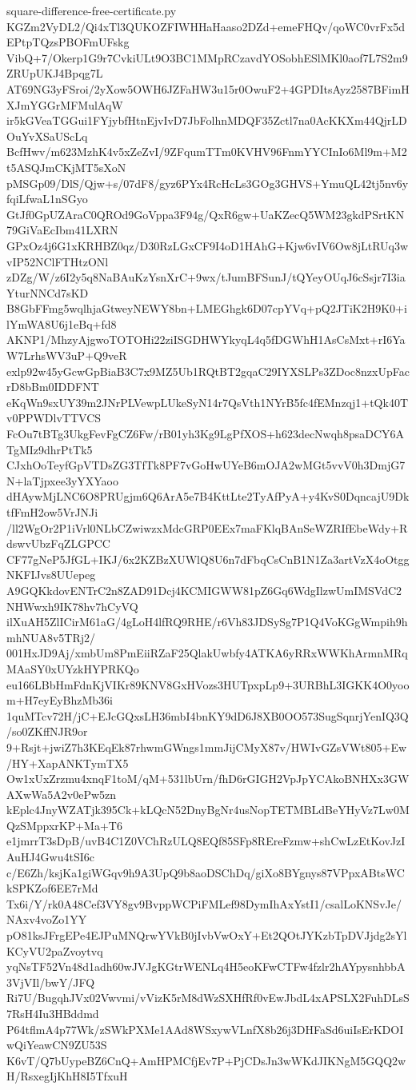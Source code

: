 \documentclass[11pt]{article}
\theoremstyle{definition}
\theoremstyle{remark}
\begin{document}
\begin{filecontents*}[overwrite]{square-difference-free-certificate.py}
KGZm2VyDL2/Qi4xTl3QUKOZFIWHHaHaaso2DZd+emeFHQv/qoWC0vrFx5dEPtpTQzsPBOFmUFskg
VibQ+7/Okerp1G9r7CvkiULt9O3BC1MMpRCzavdYOSobhESlMKl0aof7L7S2m9ZRUpUKJ4Bpqg7L
AT69NG3yFSroi/2yXow5OWH6JZFaHW3u15r0OwuF2+4GPDItsAyz2587BFimHXJmYGGrMFMulAqW
ir5kGVeaTGGui1FYjybfHtnEjvIvD7JbFolhnMDQF35Zctl7na0AcKKXm44QjrLDOuYvXSaUScLq
BcfHwv/m623MzhK4v5xZeZvI/9ZFqumTTm0KVHV96FnmYYCInIo6Ml9m+M2t5ASQJmCKjMT5sXoN
pMSGp09/DlS/Qjw+s/07dF8/gyz6PYx4RcHcLs3GOg3GHVS+YmuQL42tj5nv6yfqiLfwaL1nSGyo
GtJf0GpUZAraC0QROd9GoVppa3F94g/QxR6gw+UaKZecQ5WM23gkdPSrtKN79GiVaEcIbm41LXRN
GPxOz4j6G1xKRHBZ0qz/D30RzLGxCF9I4oD1HAhG+Kjw6vIV6Ow8jLtRUq3wvIP52NClFTHtzONl
zDZg/W/z6I2y5q8NaBAuKzYsnXrC+9wx/tJumBFSunJ/tQYeyOUqJ6cSsjr7I3iaYturNNCd7sKD
B8GbFFmg5wqlhjaGtweyNEWY8bn+LMEGhgk6D07cpYVq+pQ2JTiK2H9K0+ilYmWA8U6j1eBq+fd8
AKNP1/MhzyAjgwoTOTOHi22ziISGDHWYkyqL4q5fDGWhH1AsCsMxt+rI6YaW7LrhsWV3uP+Q9veR
exlp92w45yGcwGpBiaB3C7x9MZ5Ub1RQtBT2gqaC29IYXSLPs3ZDoc8nzxUpFacrD8bBm0IDDFNT
eKqWn9sxUY39m2JNrPLVewpLUkeSyN14r7QsVth1NYrB5fc4fEMnzqj1+tQk40Tv0PPWDlvTTVCS
FcOu7tBTg3UkgFevFgCZ6Fw/rB01yh3Kg9LgPfXOS+h623decNwqh8psaDCY6ATgMIz9dhrPtTk5
CJxhOoTeyfGpVTDsZG3TfTk8PF7vGoHwUYeB6mOJA2wMGt5vvV0h3DmjG7N+laTjpxee3yYXYaoo
dHAywMjLNC6O8PRUgjm6Q6ArA5e7B4KttLte2TyAfPyA+y4KvS0DqncajU9DktfFmH2ow5VrJNJi
/ll2WgOr2P1iVrl0NLbCZwiwzxMdcGRP0EEx7maFKlqBAnSeWZRIfEbeWdy+RdswvUbzFqZLGPCC
CF77gNeP5JfGL+IKJ/6x2KZBzXUWlQ8U6n7dFbqCsCnB1N1Za3artVzX4oOtggNKFIJvs8UUepeg
A9GQKkdovENTrC2n8ZAD91Dcj4KCMIGWW81pZ6Gq6WdgIlzwUmIMSVdC2NHWwxh9IK78hv7hCyVQ
ilXuAH5ZlICirM61aG/4gLoH4lfRQ9RHE/r6Vh83JDSySg7P1Q4VoKGgWmpih9hmhNUA8v5TRj2/
001HxJD9Aj/xmbUm8PmEiiRZaF25QlakUwbfy4ATKA6yRRxWWKhArmnMRqMAaSY0xUYzkHYPRKQo
eu166LBbHmFdnKjVIKr89KNV8GxHVozs3HUTpxpLp9+3URBhL3IGKK4O0yoom+H7eyEyBhzMb36i
1quMTcv72H/jC+EJcGQxsLH36mbI4bnKY9dD6J8XB0OO573SugSqnrjYenIQ3Q/so0ZKffNJR9or
9+Rsjt+jwiZ7h3KEqEk87rhwmGWngs1mmJijCMyX87v/HWIvGZsVWt805+Ew/HY+XapANKTymTX5
Ow1xUxZrzmu4xnqF1toM/qM+531lbUrn/fhD6rGIGH2VpJpYCAkoBNHXx3GWAXwWa5A2v0ePw5zn
kEplc4JnyWZATjk395Ck+kLQcN52DnyBgNr4usNopTETMBLdBeYHyVz7Lw0MQzSMppxrKP+Ma+T6
e1jmrrT3sDpB/uvB4C1Z0VChRzULQ8EQf85SFp8REreFzmw+shCwLzEtKovJzIAuHJ4Gwu4tSI6c
c/E6Zh/ksjKa1giWGqv9h9A3UpQ9b8aoDSChDq/giXo8BYgnys87VPpxABtsWCkSPKZof6EE7rMd
Tx6i/Y/rk0A48Cef3VY8gv9BvppWCPiFMLef98DymIhAxYstI1/csalLoKNSvJe/NAxv4voZo1YY
pO81ksJFrgEPe4EJPuMNQrwYVkB0jIvbVwOxY+Et2QOtJYKzbTpDVJjdg2sYlKCyVU2paZvoytvq
yqNsTF52Vn48d1adh60wJVJgKGtrWENLq4H5eoKFwCTFw4fzlr2hAYpysnhbbA3VjVIl/bwY/JFQ
Ri7U/BugqhJVx02Vwvmi/vVizK5rM8dWzSXHfRf0vEwJbdL4xAPSLX2FuhDLsS7RsH4Iu3HBddmd
P64tflmA4p77Wk/zSWkPXMe1AAd8WSxywVLnfX8b26j3DHFaSd6uiIsErKDOIwQiYeawCN9ZU53S
K6vT/Q7bUypeBZ6CnQ+AmHPMCfjEv7P+PjCDsJn3wWKdJIKNgM5GQQ2wH/RsxegIjKhH8I5TfxuH

\end{filecontents*}
\end{document}

